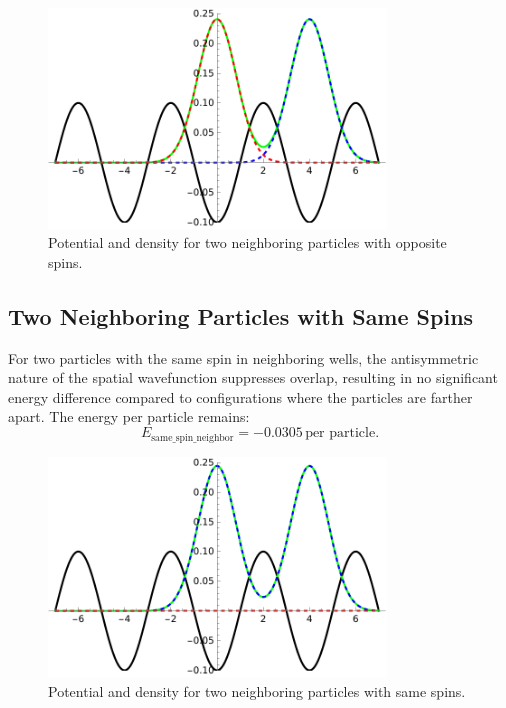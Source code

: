 \documentclass[11pt]{article}
\begin{document}
\begin{figure}[h]
    \centering
    \includegraphics[width=0.8\textwidth]{IMGopposite_spin_neighbor.pdf}
    \caption{Potential and density for two neighboring particles with opposite spins.}
    \label{fig:opposite_spin_neighbor}
\end{figure}

\subsection{Two Neighboring Particles with Same Spins}
For two particles with the same spin in neighboring wells, the antisymmetric nature of the spatial wavefunction suppresses overlap, resulting in no significant energy difference compared to configurations where the particles are farther apart. The energy per particle remains:
\begin{equation}
E_\text{same\_spin\_neighbor} = -0.0305 \, \text{per particle}.
\end{equation}

\begin{figure}[h]
    \centering
    \includegraphics[width=0.8\textwidth]{IMGsame_spin_neighbor.pdf}
    \caption{Potential and density for two neighboring particles with same spins.}
    \label{fig:same_spin_neighbor}
\end{figure}
\end{document}
